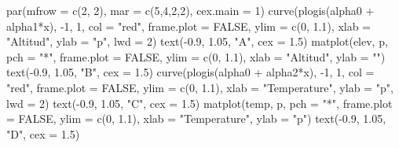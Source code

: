 \documentclass[
]{book}
\newenvironment{Shaded}{\begin{snugshade}}{\end{snugshade}}
\newcommand{\AttributeTok}[1]{\textcolor[rgb]{0.77,0.63,0.00}{#1}}
\newcommand{\ConstantTok}[1]{\textcolor[rgb]{0.00,0.00,0.00}{#1}}
\newcommand{\DecValTok}[1]{\textcolor[rgb]{0.00,0.00,0.81}{#1}}
\newcommand{\FloatTok}[1]{\textcolor[rgb]{0.00,0.00,0.81}{#1}}
\newcommand{\FunctionTok}[1]{\textcolor[rgb]{0.00,0.00,0.00}{#1}}
\newcommand{\NormalTok}[1]{#1}
\newcommand{\SpecialCharTok}[1]{\textcolor[rgb]{0.00,0.00,0.00}{#1}}
\newcommand{\StringTok}[1]{\textcolor[rgb]{0.31,0.60,0.02}{#1}}
\begin{document}
\begin{Shaded}
\begin{Highlighting}[]
\FunctionTok{par}\NormalTok{(}\AttributeTok{mfrow =} \FunctionTok{c}\NormalTok{(}\DecValTok{2}\NormalTok{, }\DecValTok{2}\NormalTok{), }\AttributeTok{mar =} \FunctionTok{c}\NormalTok{(}\DecValTok{5}\NormalTok{,}\DecValTok{4}\NormalTok{,}\DecValTok{2}\NormalTok{,}\DecValTok{2}\NormalTok{), }\AttributeTok{cex.main =} \DecValTok{1}\NormalTok{)}
\FunctionTok{curve}\NormalTok{(}\FunctionTok{plogis}\NormalTok{(alpha0 }\SpecialCharTok{+}\NormalTok{ alpha1}\SpecialCharTok{*}\NormalTok{x), }\SpecialCharTok{{-}}\DecValTok{1}\NormalTok{, }\DecValTok{1}\NormalTok{, }\AttributeTok{col =} \StringTok{"red"}\NormalTok{, }\AttributeTok{frame.plot =} \ConstantTok{FALSE}\NormalTok{, }\AttributeTok{ylim =} \FunctionTok{c}\NormalTok{(}\DecValTok{0}\NormalTok{, }\FloatTok{1.1}\NormalTok{), }
      \AttributeTok{xlab =} \StringTok{"Altitud"}\NormalTok{, }\AttributeTok{ylab =} \StringTok{"p"}\NormalTok{, }\AttributeTok{lwd =} \DecValTok{2}\NormalTok{)}
\FunctionTok{text}\NormalTok{(}\SpecialCharTok{{-}}\FloatTok{0.9}\NormalTok{, }\FloatTok{1.05}\NormalTok{, }\StringTok{"A"}\NormalTok{, }\AttributeTok{cex =} \FloatTok{1.5}\NormalTok{)}
\FunctionTok{matplot}\NormalTok{(elev, p, }\AttributeTok{pch =} \StringTok{"*"}\NormalTok{, }\AttributeTok{frame.plot =} \ConstantTok{FALSE}\NormalTok{, }\AttributeTok{ylim =} \FunctionTok{c}\NormalTok{(}\DecValTok{0}\NormalTok{, }\FloatTok{1.1}\NormalTok{), }\AttributeTok{xlab =} \StringTok{"Altitud"}\NormalTok{, }
        \AttributeTok{ylab =} \StringTok{""}\NormalTok{)}
\FunctionTok{text}\NormalTok{(}\SpecialCharTok{{-}}\FloatTok{0.9}\NormalTok{, }\FloatTok{1.05}\NormalTok{, }\StringTok{"B"}\NormalTok{, }\AttributeTok{cex =} \FloatTok{1.5}\NormalTok{)}
\FunctionTok{curve}\NormalTok{(}\FunctionTok{plogis}\NormalTok{(alpha0 }\SpecialCharTok{+}\NormalTok{ alpha2}\SpecialCharTok{*}\NormalTok{x), }\SpecialCharTok{{-}}\DecValTok{1}\NormalTok{, }\DecValTok{1}\NormalTok{, }\AttributeTok{col =} \StringTok{"red"}\NormalTok{, }\AttributeTok{frame.plot =} \ConstantTok{FALSE}\NormalTok{, }\AttributeTok{ylim =} \FunctionTok{c}\NormalTok{(}\DecValTok{0}\NormalTok{, }\FloatTok{1.1}\NormalTok{), }
      \AttributeTok{xlab =} \StringTok{"Temperature"}\NormalTok{, }\AttributeTok{ylab =} \StringTok{"p"}\NormalTok{, }\AttributeTok{lwd =} \DecValTok{2}\NormalTok{)}
\FunctionTok{text}\NormalTok{(}\SpecialCharTok{{-}}\FloatTok{0.9}\NormalTok{, }\FloatTok{1.05}\NormalTok{, }\StringTok{"C"}\NormalTok{, }\AttributeTok{cex =} \FloatTok{1.5}\NormalTok{)}
\FunctionTok{matplot}\NormalTok{(temp, p, }\AttributeTok{pch =} \StringTok{"*"}\NormalTok{, }\AttributeTok{frame.plot =} \ConstantTok{FALSE}\NormalTok{, }\AttributeTok{ylim =} \FunctionTok{c}\NormalTok{(}\DecValTok{0}\NormalTok{, }\FloatTok{1.1}\NormalTok{), }\AttributeTok{xlab =} \StringTok{"Temperature"}\NormalTok{, }
        \AttributeTok{ylab =} \StringTok{"p"}\NormalTok{)}
\FunctionTok{text}\NormalTok{(}\SpecialCharTok{{-}}\FloatTok{0.9}\NormalTok{, }\FloatTok{1.05}\NormalTok{, }\StringTok{"D"}\NormalTok{, }\AttributeTok{cex =} \FloatTok{1.5}\NormalTok{)}
\end{Highlighting}
\end{Shaded}
\end{document}
